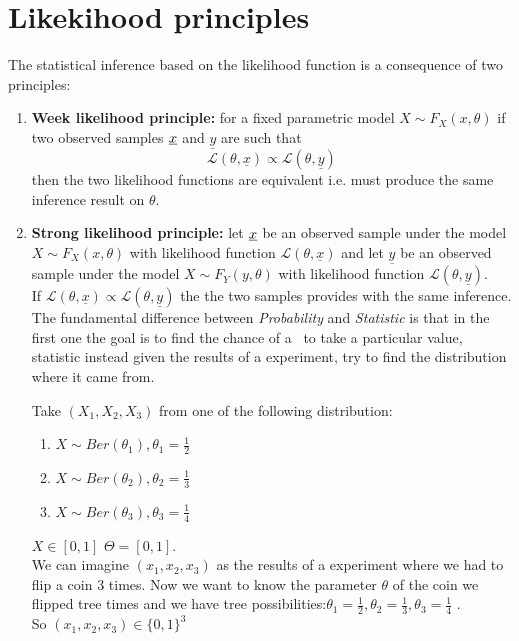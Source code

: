 \section{Likekihood principles}
The statistical inference based on the likelihood function is a consequence of two principles:
\begin{enumerate}
	\item \textbf{Week likelihood principle:} for a fixed parametric model $X\sim F_X(x,\theta)$ if two observed samples $\underline x$ and $ \underline{y}$ are such that $$\mathcal{L}(\theta,\underline x) \propto \mathcal{L}(\theta,\underline y)$$ 
	then the two likelihood functions are equivalent i.e. must produce the same inference result on $\theta$.
	\item \textbf{Strong likelihood principle:} let $\underline x$ be an observed sample under the model $X\sim F_X(x,\theta)$ with likelihood function $\mathcal{L}(\theta,\underline x)$ and let $\underline y$ be an observed sample under the model $X\sim F_Y(y,\theta)$ with likelihood function $\mathcal{L}(\theta,\underline y)$.\\
	If $\mathcal{L}(\theta,\underline x) \propto \mathcal{L}(\theta,\underline y)$ the the two samples provides with the same inference.\\
	
	
	The fundamental difference between \textit{Probability} and \textit{Statistic} is that in the first one the goal is to find the chance of a \rv \ to take a particular value, statistic instead given the results of a experiment, try to find the distribution where it came from.\\
	\begin{eg}
		Take $(X_1,X_2,X_3)$ from one of the following distribution:
		\begin{enumerate}
			\item $X\sim Ber(\theta_1), \theta_1=\frac{1}{2}$
			\item $X\sim Ber(\theta_2), \theta_2=\frac{1}{3}$
			\item $X\sim Ber(\theta_3), \theta_3=\frac{1}{4}$
		\end{enumerate}
	$X\in [0,1]$ $\Theta = [0,1]$.\\
	We can imagine $(x_1,x_2,x_3)$ as the results of a experiment where we had to flip a coin 3 times. Now we want to know the parameter $\theta$ of the coin we flipped tree times and we have tree possibilities:$\theta_1=\frac{1}{2}, \theta_2=\frac{1}{3}, \theta_3=\frac{1}{4}$ .
	\\So $(x_1,x_2,x_3)\in \{0 ,1 \}^3$
	

\end{eg}
\end{enumerate}
